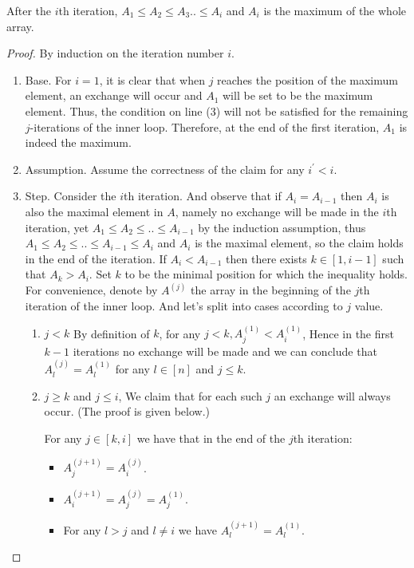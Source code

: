 \begin{claim}
  \label{claim:first}
  After the $i$th iteration, $A_{1} \le A_{2} \le A_{3} .. \le A_{i}$ and $A_{i}$ is the maximum of the whole array. 
\end{claim}
\begin{proof}
  By induction on the iteration number $i$. 
  \begin{enumerate}
    \item Base. For $i=1$, it is clear that when $j$ reaches the position of the maximum element, an exchange will occur and $A_{1}$ will be set to be the maximum element. Thus, the condition on line (3) will not be satisfied for the remaining $j$-iterations of the inner loop. Therefore, at the end of the first iteration, $A_{1}$ is indeed the maximum.
    \item Assumption. Assume the correctness of the claim for any $i^{\prime} < i$. 
    \item Step. Consider the $i$th iteration. And observe that if $A_{i} = A_{i-1}$ then $A_{i}$ is also the maximal element in $A$, namely no exchange will be made in the $i$th iteration, yet $A_{1} \le A_{2} \le .. \le A_{i-1}$ by the induction assumption, thus  $A_{1} \le A_{2} \le .. \le A_{i-1} \le A_{i}$ and $A_{i}$ is the maximal element, so the claim holds in the end of the iteration. 
      If $A_{i} < A_{i-1}$ then there exists $k \in [1,i-1]$ such that $A_{k} > A_{i}$. Set $k$ to be the minimal position for which the inequality holds. For convenience, denote by $A^{(j)}$ the array in the beginning of the $j$th iteration of the inner loop. And let's split into cases according to $j$ value. 
      \begin{enumerate}
        \item $j < k$ By definition of $k$, for any $j < k, A^{(1)}_{j} < A^{(1)}_{i}$, Hence in the first $k-1$ iterations no exchange will be made and we can conclude that $A^{(j)}_{l} = A^{(1)}_{l}$ for any $l \in [n]$ and $j \le k$. 
        \item $j \ge k$ and $j\le i$, We claim that for each such $j$ an exchange will always occur. (The proof is given below.)
          \begin{claim}
            \label{claim:second}
            For any $j \in [k,i]$ we have that in the end of the $j$th iteration:  
            \begin{itemize}
              \item $A^{(j+1)}_{j} = A^{(j)}_{i}$.
              \item $A^{(j+1)}_{i} = A^{(j)}_{j} = A^{(1)}_{j}$.
              \item For any $l > j$ and $l \neq i$ we have $A^{(j+1)}_{l} = A^{(1)}_{l}$.
            \end{itemize}
          \end{claim}


\end{enumerate}
\end{enumerate}
\end{proof}
